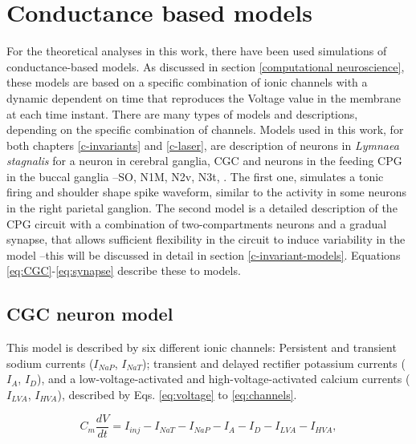\section{Conductance based models}
For the theoretical analyses in this work, there have been used simulations of conductance-based models. As discussed in section \ref{computational neuroscience}, these models are based on a specific combination of ionic channels with a dynamic dependent on time that reproduces the Voltage value in the membrane at each time instant. There are many types of models and descriptions, depending on the specific combination of channels. Models used in this work, for both chapters \ref{c-invariants} and \ref{c-laser}, are description of neurons in \textit{Lymnaea stagnalis} for a neuron in cerebral ganglia, CGC \parencite{vavoulis_balanced_2010} and neurons in the feeding CPG in the buccal ganglia --SO, N1M, N2v, N3t, \parencite{vavoulis_computational_2007}. The first one, simulates a tonic firing and shoulder shape spike waveform, similar to the activity in some neurons in the right parietal ganglion. The second model is a detailed description of the CPG circuit with a combination of two-compartments neurons and a gradual synapse, that allows sufficient flexibility in the circuit to induce variability in the model --this will be discussed in detail in section \ref{c-invariant-models}. Equations \ref{eq:CGC}-\ref{eq:synapse} describe these to models. 

\subsection{CGC neuron model}
 This model is described by six different ionic channels: Persistent and transient sodium currents ($I_{NaP}$, $I_{NaT}$); transient and delayed rectifier potassium currents ($I_A$, $I_D$), and a low-voltage-activated and high-voltage-activated calcium currents ($I_{LVA}$, $I_{HVA}$), described by Eqs. \ref{eq:voltage} to \ref{eq:channels}. 
 
  \begin{equation}
 	C_m\frac{dV}{dt} = I_{inj} - I_{NaT} - I_{NaP} - I_{A} - I_{D} - I_{LVA} - I_{HVA},
 	\label{eq:voltage}
 \end{equation}
 
